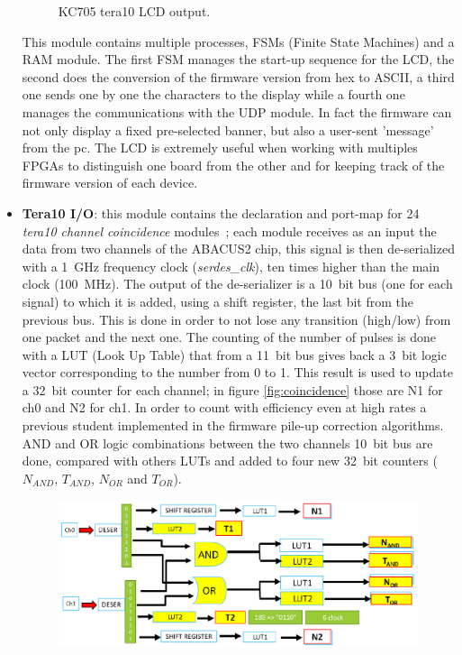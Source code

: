 \begin{itemize}
\begin{figure}[H]
		\caption{KC705 tera10 LCD output.}
		\label{fig:lcd}
	\end{figure}
	\noindent This module contains multiple processes, FSMs (Finite State Machines) and a RAM module. The first FSM manages the start-up sequence for the LCD, the second does the conversion of the firmware version from hex to ASCII, a third one sends one by one the characters to the display while a fourth one manages the communications with the UDP module. In fact the firmware can not only display a fixed pre-selected banner, but also a user-sent 'message' from the pc.
	The LCD is extremely useful when working with multiples FPGAs to distinguish one board from the other and for keeping track of the firmware version of each device.
	\item \textbf{Tera10 I/O}: this module contains the declaration and port-map for 24 \textit{tera10 channel coincidence} modules~\cite{limardi}; each module receives as an input the data from two channels of the ABACUS2 chip, this signal is then de-serialized with a 1~GHz frequency clock (\textit{serdes\_clk}), ten times higher than the main clock (100~MHz). The output of the de-serializer is a 10~bit bus (one for each signal) to which it is added, using a shift register, the last bit from the previous bus. This is done in order to not lose any transition (high/low) from one packet and the next one.
	\newline
	The counting of the number of pulses is done with a LUT (Look Up Table) that from a 11~bit bus gives back a 3~bit logic vector corresponding to the number from 0 to 1. This result is used to update a 32~bit counter for each channel; in figure \ref{fig:coincidence} those are N1 for ch0 and N2 for ch1.
	\newline
	In order to count with efficiency even at high rates a previous student implemented in the firmware pile-up correction algorithms. AND and OR logic combinations between the two channels 10~bit bus are done, compared with others LUTs and added to four new 32~bit counters ($N_{AND}$, $T_{AND}$, $N_{OR}$ and $T_{OR}$). 
	\begin{figure}[H]
		\centering
		\includegraphics[width=0.7\linewidth]{IMG/ch4/COINCIDENCE}

\end{figure}
\end{itemize}
